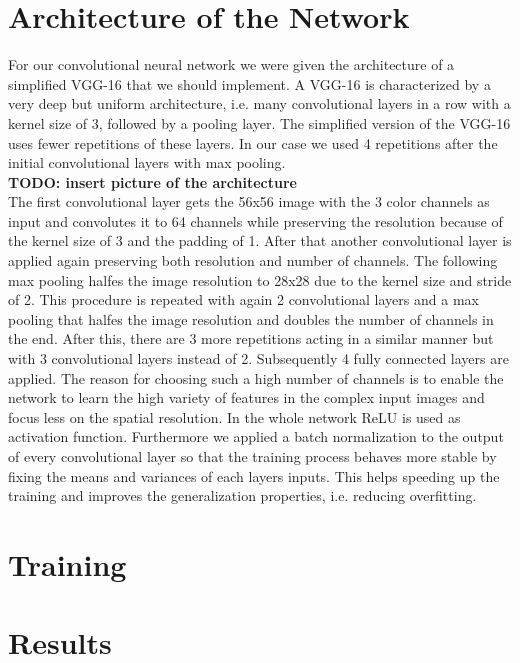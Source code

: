 \documentclass{tubaf-article}
\begin{document}
	\section{Architecture of the Network}
	\label{architecture}
	For our convolutional neural network we were given the architecture of a simplified VGG-16 that we should implement. A VGG-16 is characterized by a very deep but uniform architecture, i.e. many convolutional layers in a row with a kernel size of 3, followed by a pooling layer. The simplified version of the VGG-16 uses fewer repetitions of these layers. In our case we used 4 repetitions after the initial convolutional layers with max pooling. \\
	\textbf{TODO: insert picture of the architecture} \\
	The first convolutional layer gets the 56x56 image with the 3 color channels as input and convolutes it to 64 channels while preserving the resolution because of the kernel size of 3 and the padding of 1. After that another convolutional layer is applied again preserving both resolution and number of channels. The following max pooling halfes the image resolution to 28x28 due to the kernel size and stride of 2. This procedure is repeated with again 2 convolutional layers and a max pooling that halfes the image resolution and doubles the number of channels in the end. After this, there are 3 more repetitions acting in a similar manner but with 3 convolutional layers instead of 2. Subsequently 4 fully connected layers are applied. The reason for choosing such a high number of channels is to enable the network to learn the high variety of features in the complex input images and focus less on the spatial resolution. In the whole network ReLU is used as activation function. Furthermore we applied a batch normalization to the output of every convolutional layer so that the training process behaves more stable by fixing the means and variances of each layers inputs. This helps speeding up the training and improves the generalization properties, i.e. reducing overfitting.
	
	
	\section{Training}
	\label{training}
	
	
	
	\section{Results}
	\label{results}
	
\end{document}
